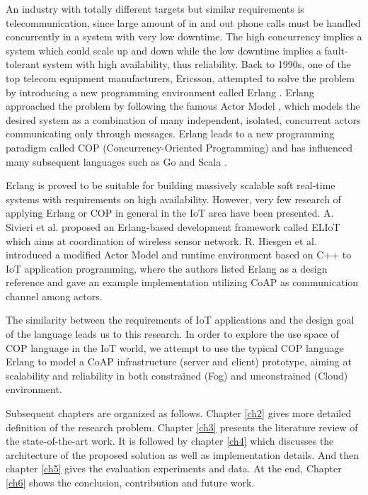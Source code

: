 An industry with totally different targets but similar requirements is telecommunication, since large amount of in and out phone calls must be handled concurrently in a system with very low downtime. The high concurrency implies a system which could scale up and down while the low downtime implies a fault-tolerant system with high availability, thus reliability. Back to 1990s, one of the top telecom equipment manufacturers, Ericsson, attempted to solve the problem by introducing a new programming environment called Erlang \cite{erl}. Erlang approached the problem by following the famous Actor Model \cite{agha1986actors}, which models the desired system as a combination of many independent, isolated, concurrent actors communicating only through messages. Erlang leads to a new programming paradigm called COP (Concurrency-Oriented Programming) \cite{armstrong2003concurrency} and has influenced many subsequent languages such as Go \cite{go} and Scala \cite{scala}.  

Erlang is proved to be suitable for building massively scalable soft real-time systems with requirements on high availability. However, very few research of applying Erlang or COP in general in the IoT area have been presented. A. Sivieri et al. \cite{Sivieri:2012:DPT:2667049.2667051} proposed an Erlang-based development framework called ELIoT which aims at coordination of wireless sensor network. R. Hiesgen et al. \cite{7034296} introduced a modified Actor Model and runtime environment based on C++ to IoT application programming, where the authors listed Erlang as a design reference and gave an example implementation utilizing CoAP as communication channel among actors.  

The similarity between the requirements of IoT applications and the design goal of the language leads us to this research. In order to explore the use space of COP language in the IoT world, we attempt to use the typical COP language Erlang to model a CoAP infrastructure (server and client) prototype, aiming at scalability and reliability in both constrained (Fog) and unconstrained (Cloud) environment.

Subsequent chapters are organized as follows. Chapter \ref{ch2} gives more detailed definition of the research problem. Chapter \ref{ch3} presents the literature review of the state-of-the-art work. It is followed by chapter \ref{ch4} which discusses the architecture of the proposed solution as well as implementation details. And then chapter \ref{ch5} gives the evaluation experiments and data. At the end, Chapter \ref{ch6} shows the conclusion, contribution and future work.